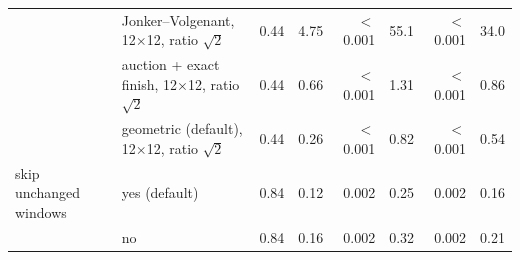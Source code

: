 \begin{tabular}{llrrrrrr}
 & Jonker--Volgenant, 12$\times$12, ratio $\sqrt2$ & 0.44 & 4.75 & $<$0.001 & 55.1 & $<$0.001 & 34.0 \\
 & auction + exact finish, 12$\times$12, ratio $\sqrt2$ & 0.44 & 0.66 & $<$0.001 & 1.31 & $<$0.001 & 0.86 \\
 & geometric (default), 12$\times$12, ratio $\sqrt2$ & 0.44 & 0.26 & $<$0.001 & 0.82 & $<$0.001 & 0.54 \\
\addlinespace
skip unchanged windows & yes (default) & 0.84 & 0.12 & 0.002 & 0.25 & 0.002 & 0.16 \\
 & no & 0.84 & 0.16 & 0.002 & 0.32 & 0.002 & 0.21 \\
\bottomrule
\end{tabular}
